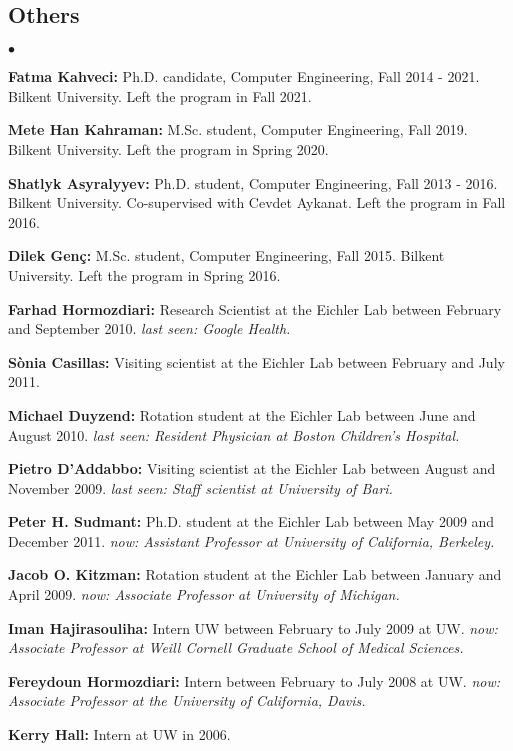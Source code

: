 \documentclass[margin,line]{res}
\newenvironment{list2}{
  \begin{list}{$\bullet$}{%
      \setlength{\itemsep}{0.1cm}
      \setlength{\parsep}{0in} \setlength{\parskip}{0in}
      \setlength{\topsep}{0in} \setlength{\partopsep}{0in} 
      \setlength{\leftmargin}{0.2in}}}{\end{list}}
\begin{document}
\begin{resume}
\subsection{\small \sc Others}
\begin{list2}
\item
  {\bf Fatma Kahveci:} Ph.D. candidate, Computer Engineering, Fall 2014 - 2021. 
  Bilkent University. Left the program in Fall 2021.
\item
  {\bf Mete Han Kahraman:} M.Sc. student, Computer Engineering, Fall 2019.  
  Bilkent University. Left the program in Spring 2020.
\item
  {\bf Shatlyk Asyralyyev:} Ph.D. student, Computer Engineering, Fall 2013 - 2016.
  Bilkent University. Co-supervised with Cevdet Aykanat. Left the program in Fall 2016.
\item
{\bf Dilek Genç:} M.Sc. student, Computer Engineering, Fall 2015.
  Bilkent University. Left the program in Spring 2016. 
\item
  {\bf Farhad Hormozdiari:} Research Scientist at the Eichler Lab between February and September 2010.
  {\it last seen: Google Health.}
\item
  {\bf S\`{o}nia Casillas:} Visiting scientist at the Eichler Lab between February and July 2011.
\item
  {\bf Michael Duyzend:} Rotation student at the Eichler Lab between June and August 2010.
  {\it last seen:  Resident Physician at Boston Children's Hospital.}
\item
  {\bf Pietro D'Addabbo:} Visiting scientist at the Eichler Lab between August and November 2009.
  {\it last seen: Staff scientist at University of Bari.}
\item
  {\bf Peter H. Sudmant:} Ph.D. student at the Eichler Lab between May 2009 and December 2011.
  {\it now: Assistant Professor at University of California, Berkeley.}
\item
  {\bf Jacob O. Kitzman:} Rotation student at the Eichler Lab between January and April 2009.
  {\it now: Associate Professor at University of Michigan.}
\item
  {\bf Iman Hajirasouliha:}  Intern UW between February to July 2009 at UW.
  {\it now: Associate Professor at Weill Cornell Graduate School of Medical Sciences.}
\item
  {\bf Fereydoun Hormozdiari:} Intern between February to July 2008 at UW. 
  {\it now: Associate Professor at the University of California, Davis.}
\item
  {\bf Kerry Hall:} Intern at UW in 2006.  
\end{list2}



\end{resume}
\end{document}
